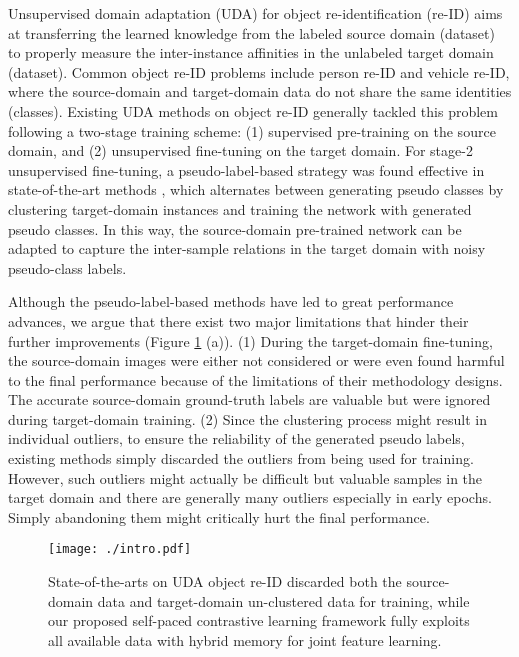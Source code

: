 \documentclass{article}
\begin{document}
Unsupervised domain adaptation (UDA) for object re-identification (re-ID) aims at transferring the learned knowledge from the labeled source domain (dataset) to properly measure the inter-instance affinities in the unlabeled target domain (dataset). 
Common object re-ID problems include person re-ID and vehicle re-ID, 
where the source-domain and target-domain data do not share the same identities (classes).
Existing UDA methods on object re-ID \cite{song2018unsupervised,ge2020mutual,zhai2020ad,yang2019selfsimilarity,zhang2019self,wang2020unsupervised} generally tackled this problem following a two-stage training scheme: (1) supervised pre-training on the source domain, and (2) unsupervised fine-tuning on the target domain.
For stage-2 unsupervised fine-tuning, a pseudo-label-based strategy was found effective in state-of-the-art methods \cite{ge2020mutual,zhai2020ad,yang2019selfsimilarity,zhang2019self},
which alternates between 
generating pseudo classes by clustering target-domain instances and 
training the network with generated pseudo classes. In this way, the source-domain pre-trained network can be adapted to capture the inter-sample relations in the target domain with noisy pseudo-class labels.


Although the pseudo-label-based methods have led to great performance advances, we argue that there exist two major limitations that hinder their further improvements (Figure \ref{fig:intro} (a)). 
(1) During the target-domain fine-tuning, the source-domain images were either not considered \cite{ge2020mutual,zhai2020ad,yang2019selfsimilarity,zhang2019self} or were even found harmful to the final performance \cite{ge2020structured} because of the limitations of their methodology designs. 
The accurate source-domain ground-truth labels are valuable but were ignored during target-domain training. 
(2) Since the clustering process might result in individual outliers, to ensure the reliability of the generated pseudo labels, existing methods \cite{ge2020mutual,yang2019selfsimilarity,zhang2019self,ge2020structured} simply discarded the outliers from being used for training. However, such outliers might actually be difficult but valuable samples in the target domain and there are generally many outliers especially in early epochs. Simply abandoning them might critically hurt the final performance. 



\begin{figure}[t]
\centering
\texttt{[image: ./intro.pdf]}
\caption{State-of-the-arts \cite{ge2020mutual,yang2019selfsimilarity,zhang2019self,zhai2020ad} on UDA object re-ID discarded both the source-domain data and target-domain un-clustered data for training, while our proposed self-paced contrastive learning framework fully exploits all available data with hybrid memory for joint feature learning.}
\label{fig:intro}
\end{figure}
\end{document}
